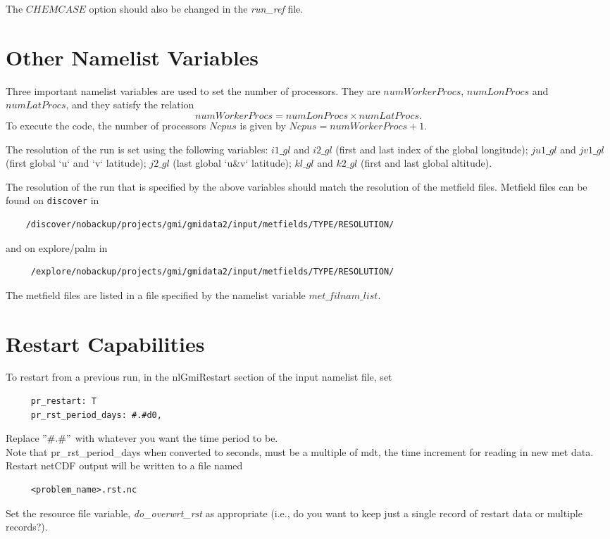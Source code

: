 The {\tt $CHEMCASE$} option should also be changed in the {\em run\_ref} 
file.

\section{Other Namelist Variables} \label{sec:NamelistVariables}

Three important namelist variables are used to set the number of
processors.
They are {\tt $numWorkerProcs$}, {\tt $numLonProcs$} and {\tt $numLatProcs$}, and
they satisfy the relation 
%
$$numWorkerProcs = numLonProcs \times numLatProcs.$$
%
To execute the code, the number of processors {\tt $Ncpus$} is given
by {\tt $Ncpus = numWorkerProcs + 1$}.

The resolution of the run is set using the following variables: 
{\tt $i1\_gl$} and {\tt $i2\_gl$} (first and last index of the global longitude); 
{\tt $ju1\_gl$} and {\tt $jv1\_gl$} (first global `u` and `v` latitude); 
{\tt $j2\_gl$} (last global `u\&v` latitude); {\tt $kl\_gl$} and 
{\tt $k2\_gl$} (first and last global altitude).

\begin{remark}
The resolution of the run that is specified by the above variables should 
match the resolution of the metfield files.  
Metfield files can be found on {\tt discover} in
%
\begin{verbatim}
    /discover/nobackup/projects/gmi/gmidata2/input/metfields/TYPE/RESOLUTION/
\end{verbatim}
%

and on explore/palm in
%
\begin{verbatim}
     /explore/nobackup/projects/gmi/gmidata2/input/metfields/TYPE/RESOLUTION/
\end{verbatim}
%

The metfield files are listed in a file specified by the namelist variable 
{\tt $met\_filnam\_list$}.
\end{remark}


\section{Restart Capabilities} \label{sec:Restart}
To restart from a previous run, in the nlGmiRestart section of the input namelist file, set
%
\begin{verbatim}
     pr_restart: T
     pr_rst_period_days: #.#d0,
\end{verbatim}
%
   Replace $"\#.\#"$ with whatever you want the time period to be. \\
%
   Note that pr\_rst\_period\_days when converted to seconds, must be
   a multiple of mdt, the time increment for reading in new met data.
%
Restart netCDF output will be written to a file named
%
\begin{verbatim}
     <problem_name>.rst.nc
\end{verbatim}
%
   Set the resource file variable, {\em do\_overwrt\_rst} as appropriate
   (i.e., do you want to keep just a single record of restart data or
   multiple records?).

